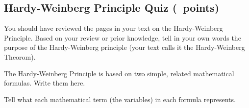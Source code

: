 \documentclass[11pt, addpoints]{exam}
\begin{document}
\subsection*{Hardy-Weinberg Principle Quiz (\numpoints\ points)}

\begin{questions}

\question[3]
You should have reviewed the pages in your text on the Hardy-Weinberg Principle. Based on your review or prior knowledge, tell in your own words the purpose of the Hardy-Weinberg principle (your text calls it the Hardy-Weinberg Theorom).

\ifprintanswers\vspace*{\baselineskip}{\bfseries%
	The Hardy-Weinberg principle shows that allele and genotype frequencies cannot change in the absence of evolutionary process.}
\else
\fi

\question[2]
The Hardy-Weinberg Principle is based on two simple, related
mathematical formulas. Write them here. 

\question [5]
Tell what each mathematical term (the variables) in each formula represents.
\end{questions}
\end{document}
